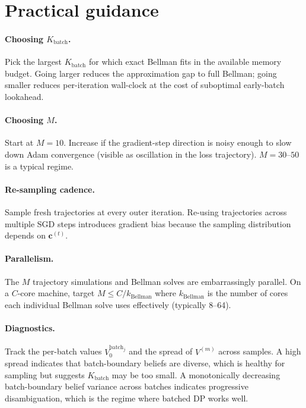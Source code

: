 \documentclass[11pt,a4paper]{article}
\newcommand{\bc}{\bm{c}}
\begin{document}
\section{Practical guidance}
\label{sec:practical}

\paragraph{Choosing $K_\mathrm{batch}$.}  Pick the largest $K_\mathrm{batch}$ for which
exact Bellman fits in the available memory budget.  Going larger reduces the
approximation gap to full Bellman; going smaller reduces per-iteration wall-clock at the
cost of suboptimal early-batch lookahead.

\paragraph{Choosing $M$.}  Start at $M = 10$.  Increase if the gradient-step direction is
noisy enough to slow down Adam convergence (visible as oscillation in the loss trajectory).
$M = 30$--$50$ is a typical regime.

\paragraph{Re-sampling cadence.}  Sample fresh trajectories at every outer iteration.
Re-using trajectories across multiple SGD steps introduces gradient bias because the
sampling distribution depends on $\bc^{(t)}$.

\paragraph{Parallelism.}  The $M$ trajectory simulations and Bellman solves are
embarrassingly parallel.  On a $C$-core machine, target $M \le C / k_\mathrm{Bellman}$
where $k_\mathrm{Bellman}$ is the number of cores each individual Bellman solve uses
effectively (typically 8--64).

\paragraph{Diagnostics.}  Track the per-batch values $V_0^{\mathrm{batch}_j}$ and the
spread of $V^{(m)}$ across samples.  A high spread indicates that batch-boundary beliefs
are diverse, which is healthy for sampling but suggests $K_\mathrm{batch}$ may be too
small.  A monotonically decreasing batch-boundary belief variance across batches
indicates progressive disambiguation, which is the regime where batched DP works well.
\end{document}
